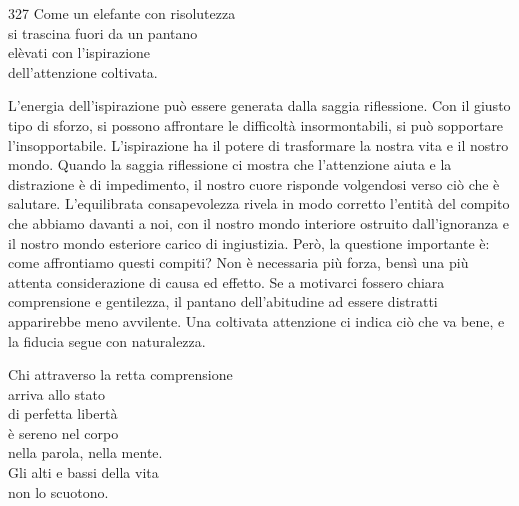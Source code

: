 
\begin{dhpVerse}{327}
\label{dhp-327}
Come un elefante con risolutezza\\
si trascina fuori da un pantano\\
elèvati con l'ispirazione\\
dell'attenzione coltivata.
\end{dhpVerse}

\begin{dhpRefl}
  L'energia dell'ispirazione può essere generata dalla saggia riflessione. Con
  il giusto tipo di sforzo, si possono affrontare le difficoltà insormontabili,
  si può sopportare l'insopportabile. L'ispirazione ha il potere di trasformare
  la nostra vita e il nostro mondo. Quando la saggia riflessione ci mostra che
  l'attenzione aiuta e la distrazione è di impedimento, il nostro cuore risponde
  volgendosi verso ciò che è salutare. L'equilibrata consapevolezza rivela in
  modo corretto l'entità del compito che abbiamo davanti a noi, con il nostro
  mondo interiore ostruito dall'ignoranza e il nostro mondo esteriore carico di
  ingiustizia. Però, la questione importante è: come affrontiamo questi compiti?
  Non è necessaria più forza, bensì una più attenta considerazione di causa ed
  effetto. Se a motivarci fossero chiara comprensione e gentilezza, il pantano
  dell'abitudine ad essere distratti apparirebbe meno avvilente. Una coltivata
  attenzione ci indica ciò che va bene, e la fiducia segue con naturalezza.
\end{dhpRefl}


\begin{dhpVerse}{96}
\label{dhp-96}
Chi attraverso la retta comprensione\\
arriva allo stato\\
di perfetta libertà\\
è sereno nel corpo\\
nella parola, nella mente.\\
Gli alti e bassi della vita\\
non lo scuotono.
\end{dhpVerse}

